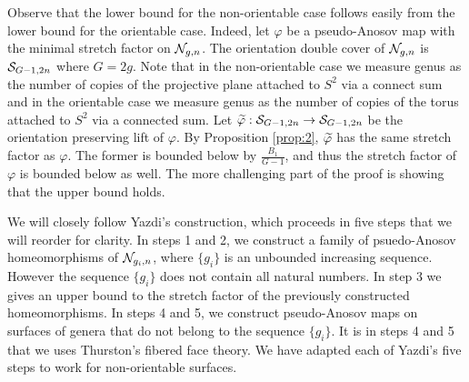 
Observe that the lower bound for the non-orientable case follows easily from the lower bound for the orientable case.
Indeed, let $\varphi$ be a pseudo-Anosov map with the minimal stretch factor on $\mathcal{N}_{g,n}$. The orientation double cover of $\mathcal{N}_{g,n}$ is $\mathcal{S}_{G-1,2n}$ where $G=2g$.  Note that in the non-orientable case we measure genus as the number of copies of the projective plane attached to $S^2$ via a connect sum and in the orientable case we measure genus as the number of copies of the torus attached to $S^2$ via a connected sum. Let $\widetilde{\varphi}:\mathcal{S}_{G-1, 2n}\to\mathcal{S}_{G-1,2n}$ be the orientation preserving lift of $\varphi$.
By Proposition \ref{prop:2}, $\widetilde{\varphi}$ has the same
stretch factor as $\varphi$. The former is bounded below by $\frac{B_1}{G-1}$, and thus the stretch factor of $\varphi$ is bounded
below as well. The more challenging part of the proof is showing that the upper bound holds. %

We will closely follow Yazdi's construction, which proceeds in five steps that we will reorder for clarity.  In steps 1 and 2, we construct a family of psuedo-Anosov homeomorphisms
of $\mathcal{N}_{g_i,n}$, where $\{g_i\}$ is an unbounded increasing sequence. However the sequence $\{g_i\}$ does not contain all natural numbers.  In step 3 we gives an upper bound to the stretch factor of the previously constructed homeomorphisms. In steps 4 and 5, we construct pseudo-Anosov maps on surfaces of genera that do not belong to the sequence $\{g_i\}$. It is in steps 4 and 5 that we uses
Thurston's fibered face theory. We have adapted  each of Yazdi's five steps to work for non-orientable surfaces.

